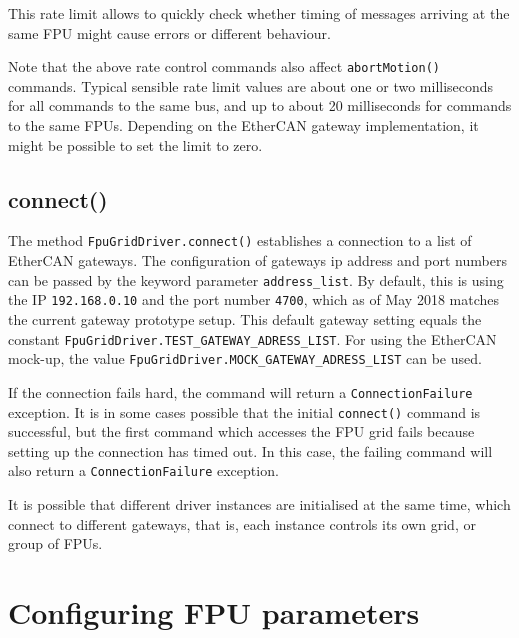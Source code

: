 \documentclass[fontsize=12,a4paper]{scrreprt}
\begin{document}
\begin{description}
  This rate limit allows to quickly check whether timing of messages
  arriving at the same FPU might cause errors or different behaviour.

  Note that the above rate control commands also affect
  \texttt{abortMotion()} commands. Typical sensible rate limit values
  are about one or two milliseconds for all commands to the same bus,
  and up to about 20 milliseconds for commands to the same FPUs.
  Depending on the EtherCAN gateway implementation, it might be
  possible to set the limit to zero.


\end{description}





\section{connect()}
\label{sec:connect}
     The method
\texttt{FpuGridDriver.connect()} establishes a connection to a list of
EtherCAN gateways. The configuration of gateways ip address and port
numbers can be passed by the keyword parameter
\texttt{address\_list}. By default, this is using the IP
\texttt{192.168.0.10} and the port number \texttt{4700}, which as of
May 2018 matches the current gateway prototype setup. This default
gateway setting equals the constant
\texttt{FpuGridDriver.TEST\_GATEWAY\_ADRESS\_LIST}.  For using the
EtherCAN mock-up, the value
\texttt{FpuGridDriver.MOCK\_GATEWAY\_ADRESS\_LIST} can be used.

If the connection fails hard, the command will return a
\texttt{ConnectionFailure} exception.  It is in some cases possible
that the initial \texttt{connect()} command is successful, but the
first command which accesses the FPU grid fails because setting up the
connection has timed out. In this case, the failing command will
also return a \texttt{ConnectionFailure} exception.

It is possible that different driver instances are initialised at the
same time, which connect to different gateways, that is, each instance
controls its own grid, or group of FPUs.

\chapter{Configuring FPU parameters}
\end{document}
